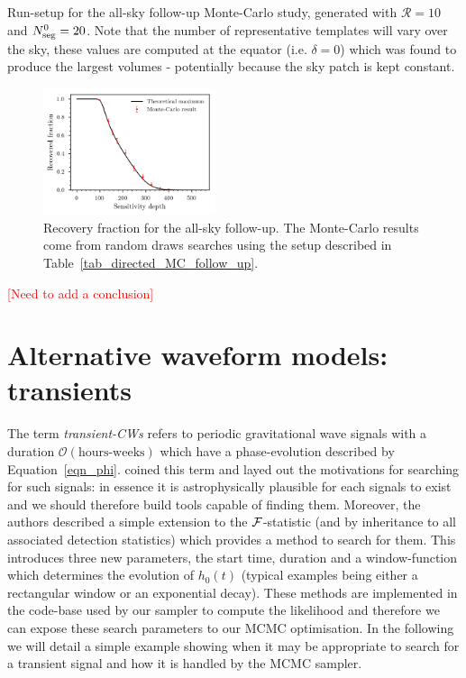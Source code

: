 \documentclass[aps, prd, twocolumn, superscriptaddress, floatfix, showpacs, nofootinbib, longbibliography]{revtex4-1}
\newcommand{\comment}[1]{\textcolor{red}{[#1]}}
\begin{document}
\begin{table}[htb]
\caption{Run-setup for the all-sky follow-up Monte-Carlo study, generated with
$\mathcal{R}=10$ and $N_{\rm seg}^0=20$. Note that the number of representative
templates will vary over the sky, these values are computed at the equator
(i.e. $\delta=0$) which was found to produce the largest volumes - potentially
because the sky patch is kept constant.}
\label{tab_allsky_MC_follow_up}

\end{table}

\begin{figure}[htb]
\centering
\includegraphics[width=0.45\textwidth]{allsky_recovery}
\caption{Recovery fraction for the all-sky follow-up. The Monte-Carlo results
come from random draws searches using the setup described in
Table~\ref{tab_directed_MC_follow_up}.}
\label{fig_allsky_MC_follow_up}
\end{figure}

\comment{Need to add a conclusion}

\section{Alternative waveform models: transients}
\label{sec_transients}

The term \emph{transient-CWs} refers to periodic gravitational wave signals
with a duration $\mathcal{O}(\textrm{hours-weeks})$ which have a
phase-evolution described by Equation~\eqref{eqn_phi}. \citet{prix2011} coined
this term and layed out the motivations for searching for such signals: in
essence it is astrophysically plausible for each signals to exist and we should
therefore build tools capable of finding them. Moreover, the authors described
a simple extension to the ${\mathcal{F}}$-statistic (and by inheritance to all associated
detection statistics) which provides a method to search for them. This
introduces three new parameters, the start time, duration and a window-function
which determines the evolution of $h_0(t)$ (typical examples being either a
rectangular window or an exponential decay). These methods are implemented in
the code-base used by our sampler to compute the likelihood and therefore we
can expose these search parameters to our MCMC optimisation. In the following
we will detail a simple example showing when it may be appropriate to search for
a transient signal and how it is handled by the MCMC sampler.
\end{document}
